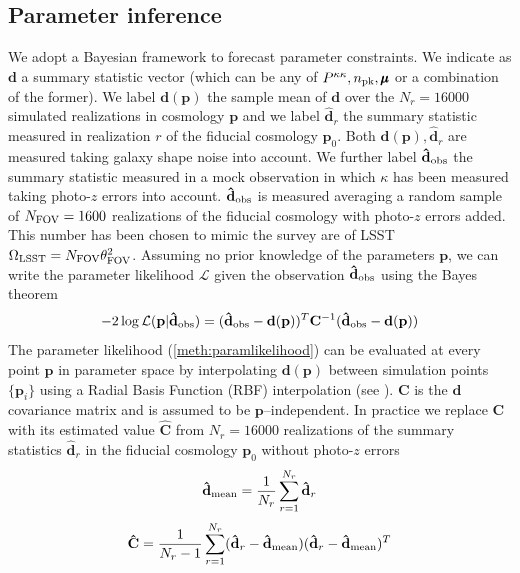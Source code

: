 \documentclass[reprint,aps,prd,superscriptaddress,showkeys,showpacs]{revtex4-1}
\newcommand{\bb}[1]{\mathbf{#1}}
\newcommand{\bbh}[1]{\mathbf{\hat{#1}}}
\begin{document}

\subsection{Parameter inference}
We adopt a Bayesian framework to forecast parameter constraints. We indicate as $\bb{d}$ a summary statistic vector (which can be any of $P^{\kappa\kappa},n_{\rm pk},\pmb{\mu}$ or a combination of the former). We label $\bb{d}(\bb{p})$ the sample mean of $\bb{d}$ over the $N_r=16000$ simulated realizations in cosmology $\bb{p}$ and we label $\bbh{d}_r$ the summary statistic measured in realization $r$ of the fiducial cosmology $\bb{p}_0$. Both $\bb{d}(\bb{p}),\bbh{d}_r$ are measured taking galaxy shape noise into account. We further label $\bbh{d}_{\rm obs}$ the summary statistic measured in a mock observation in which $\kappa$ has been measured taking photo-$z$ errors into account. $\bbh{d}_{\rm obs}$ is measured averaging a random sample of $N_{\rm FOV}=1600$ realizations of the fiducial cosmology with photo-$z$ errors added. This number has been chosen to mimic the survey are of LSST $\Omega_{\rm LSST}=N_{\rm FOV}\theta_{\rm FOV}^2$. Assuming no prior knowledge of the parameters $\bb{p}$, we can write the parameter likelihood $\mathcal{L}$ given the observation $\bbh{d}_{\rm obs}$ using the Bayes theorem
%
\begin{equation}
\label{meth:paramlikelihood}
-2\log\mathcal{L}(\bb{p}\vert \bbh{d}_{\rm obs}) = (\bbh{d}_{\rm obs} - \bb{d}(\bb{p}))^T\bb{C}^{-1}(\bbh{d}_{\rm obs} - \bb{d}(\bb{p}))
\end{equation}  
%
The parameter likelihood (\ref{meth:paramlikelihood}) can be evaluated at every point $\bb{p}$ in parameter space by interpolating $\bb{d}(\bb{p})$ between simulation points $\{\bb{p}_i\}$ using a Radial Basis Function (RBF) interpolation (see \citep{CFHTMink,LensTools-paper}). $\bb{C}$ is the $\bb{d}$ covariance matrix and is assumed to be $\bb{p}$--independent. In practice we replace $\bb{C}$ with its estimated value $\bbh{C}$ from $N_r=16000$ realizations of the summary statistics $\bbh{d}_r$ in the fiducial cosmology $\bb{p}_0$ without photo-$z$ errors
%
\begin{equation}
\bbh{d}_{\rm mean} = \frac{1}{N_r}\sum_{r=1}^{N_r}\bbh{d}_r 
\end{equation}
%
\begin{equation}
\bbh{C} = \frac{1}{N_r-1}\sum_{r=1}^{N_r} (\bbh{d}_r-\bbh{d}_{\rm mean})(\bbh{d}_r-\bbh{d}_{\rm mean})^T
\end{equation} 
\end{document}
